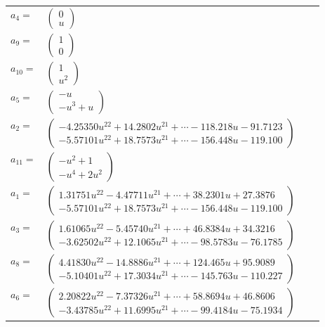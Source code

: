 \documentclass[1p]{elsarticle_modified}
\theoremstyle{definition}
\begin{document}
\begin{tabular}{m{7pt} m{180pt} m{7pt} m{180pt} }
\flushright $a_{4}=$&$\begin{pmatrix}0\\u\end{pmatrix}$ \\
\flushright $a_{9}=$&$\begin{pmatrix}1\\0\end{pmatrix}$ \\
\flushright $a_{10}=$&$\begin{pmatrix}1\\u^2\end{pmatrix}$ \\
\flushright $a_{5}=$&$\begin{pmatrix}- u\\- u^3+u\end{pmatrix}$ \\
\flushright $a_{2}=$&$\begin{pmatrix}-4.25350 u^{22}+14.2802 u^{21}+\cdots-118.218 u-91.7123\\-5.57101 u^{22}+18.7573 u^{21}+\cdots-156.448 u-119.100\end{pmatrix}$ \\
\flushright $a_{11}=$&$\begin{pmatrix}- u^2+1\\- u^4+2 u^2\end{pmatrix}$ \\
\flushright $a_{1}=$&$\begin{pmatrix}1.31751 u^{22}-4.47711 u^{21}+\cdots+38.2301 u+27.3876\\-5.57101 u^{22}+18.7573 u^{21}+\cdots-156.448 u-119.100\end{pmatrix}$ \\
\flushright $a_{3}=$&$\begin{pmatrix}1.61065 u^{22}-5.45740 u^{21}+\cdots+46.8384 u+34.3216\\-3.62502 u^{22}+12.1065 u^{21}+\cdots-98.5783 u-76.1785\end{pmatrix}$ \\
\flushright $a_{8}=$&$\begin{pmatrix}4.41830 u^{22}-14.8886 u^{21}+\cdots+124.465 u+95.9089\\-5.10401 u^{22}+17.3034 u^{21}+\cdots-145.763 u-110.227\end{pmatrix}$ \\
\flushright $a_{6}=$&$\begin{pmatrix}2.20822 u^{22}-7.37326 u^{21}+\cdots+58.8694 u+46.8606\\-3.43785 u^{22}+11.6995 u^{21}+\cdots-99.4184 u-75.1934\end{pmatrix}$ \\

\end{tabular}
\end{document}
